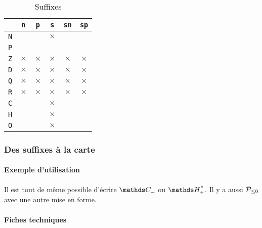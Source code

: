 \documentclass[12pt,a4paper]{article}
\theoremstyle{definition}
\begin{document}
\newcommand\xx{\phantom{$\times$}}
\begin{table}[h]
    \caption{Suffixes}
    \begin{center}
        \begin{tabular}{c|c|c|c|c|c}
              & \verb+n+ & \verb+p+ & \verb+s+ & \verb+sn+ & \verb+sp+ \\
            \hline \verb+N+ & \xx & \xx & $\times$ & \xx & \xx \\
            \hline \verb+P+ & \xx & \xx & \xx & \xx & \xx \\
            \hline \verb+Z+ & $\times$ & $\times$ & $\times$ & $\times$ & $\times$ \\
            \hline \verb+D+ & $\times$ & $\times$ & $\times$ & $\times$ & $\times$ \\
            \hline \verb+Q+ & $\times$ & $\times$ & $\times$ & $\times$ & $\times$ \\
            \hline \verb+R+ & $\times$ & $\times$ & $\times$ & $\times$ & $\times$ \\
            \hline \verb+C+ & \xx & \xx & $\times$ & \xx & \xx \\
            \hline \verb+H+ & \xx & \xx & $\times$ & \xx & \xx \\
            \hline \verb+O+ & \xx & \xx & $\times$ & \xx & \xx \\
        \end{tabular}
    \end{center}
    \label{table:suffixes-sets}
\end{table}




\subsubsection{Des suffixes à la carte}

\paragraph{Exemple d'utilisation}

\begin{tcblisting}{}
Il est tout de même possible d'écrire $\specialset{\CC}{n}$ ou $\specialset{\HH}{sp}$.
Il y a aussi $\specialset*{\probaset{P}}{n}$ avec une autre mise en forme.
\end{tcblisting}


\paragraph{Fiches techniques}
\end{document}
